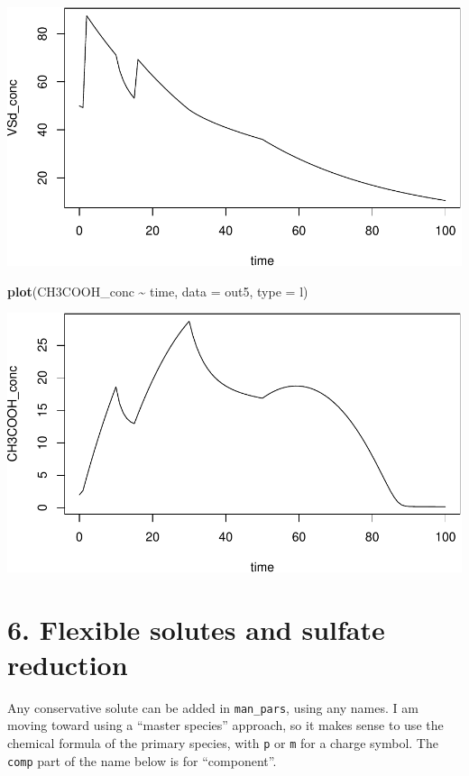 \documentclass[
]{article}
\newenvironment{Shaded}{\begin{snugshade}}{\end{snugshade}}
\newcommand{\AttributeTok}[1]{\textcolor[rgb]{0.13,0.29,0.53}{#1}}
\newcommand{\FunctionTok}[1]{\textcolor[rgb]{0.13,0.29,0.53}{\textbf{#1}}}
\newcommand{\NormalTok}[1]{#1}
\newcommand{\SpecialCharTok}[1]{\textcolor[rgb]{0.81,0.36,0.00}{\textbf{#1}}}
\newcommand{\StringTok}[1]{\textcolor[rgb]{0.31,0.60,0.02}{#1}}
\begin{document}
\includegraphics{simple_demo_files/figure-latex/unnamed-chunk-36-3.pdf}

\begin{Shaded}
\begin{Highlighting}[]
\FunctionTok{plot}\NormalTok{(CH3COOH\_conc }\SpecialCharTok{\textasciitilde{}}\NormalTok{ time, }\AttributeTok{data =}\NormalTok{ out5, }\AttributeTok{type =} \StringTok{\textquotesingle{}l\textquotesingle{}}\NormalTok{)}
\end{Highlighting}
\end{Shaded}

\includegraphics{simple_demo_files/figure-latex/unnamed-chunk-36-4.pdf}

\hypertarget{flexible-solutes-and-sulfate-reduction}{%
\section{6. Flexible solutes and sulfate
reduction}\label{flexible-solutes-and-sulfate-reduction}}

Any conservative solute can be added in \texttt{man\_pars}, using any
names. I am moving toward using a ``master species'' approach, so it
makes sense to use the chemical formula of the primary species, with
\texttt{p} or \texttt{m} for a charge symbol. The \texttt{comp} part of
the name below is for ``component''.
\end{document}
